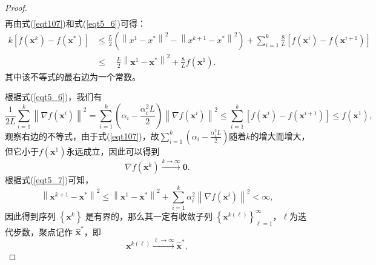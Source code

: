 \begin{proof}
\begin{equation}
\begin{split}
        \nonumber
        \end{split}
    \end{equation}
    再由式(\ref{eqt107})和式(\ref{eqt5_6})可得：
    \begin{equation}
        \begin{split}
        k\left[f\left(\bm{x}^{k}\right)-f\left(\bm{x}^{*}\right)\right]  &\leq \frac{L}{2}\left(\left\|x^{1}-x^{*}\right\|^{2}-\left\|x^{k+1}-x^{*}\right\|^{2}\right)+\sum_{i=1}^{k} \frac{8}{L}\left[f\left(\bm{x}^{i}\right)-f\left(\bm{x}^{i+1}\right)\right]\\
        & \leq \quad \frac{L}{2}\left\|\bm{x}^{1}-\bm{x}^{*}\right\|^{2}+\frac{8}{L} f\left(\bm{x}^{1}\right) .
        \label{eqt5_8}
        \end{split}
    \end{equation}
    其中该不等式的最右边为一个常数。
\par 根据式(\ref{eqt5_6})，我们有
    \begin{equation}
        \frac{1}{2 L} \sum_{i=1}^{k}\left\|\nabla f\left(\bm{x}^{i}\right)\right\|^{2}=\sum_{i=1}^{k}\left(\alpha_{i}-\frac{\alpha_{i}^{2} L}{2}\right)\left\|\nabla f\left(\bm{x}^{i}\right)\right\|^{2} \leq \sum_{i=1}^{k}\left[f\left(\bm{x}^{i}\right)-f\left(\bm{x}^{i+1}\right)\right] \leq f\left(\bm{x}^{1}\right) ,
        \nonumber
    \end{equation}
    观察右边的不等式，由于式(\ref{eqt107})，故$\sum_{i=1}^{k}\left(\alpha_{i}-\frac{\alpha_{i}^{2} L}{2}\right)$随着$k$的增大而增大，但它小于$f\left(\bm{x}^{1}\right)$永远成立，因此可以得到
    \begin{equation}
        \nabla f\left(\bm{x}^{k}\right) \stackrel{k \rightarrow \infty}{\longrightarrow} \mathbf{0} .
        \nonumber
    \end{equation}
    根据式(\ref{eqt5_7})可知，
    \begin{equation}
        \left\|\bm{x}^{k+1}-\bm{x}^{*}\right\|^{2} \leq\left\|\bm{x}^{1}-\bm{x}^{*}\right\|^{2}+\sum_{i=1}^{k} \alpha_{i}^{2}\left\|\nabla f\left(\bm{x}^{i}\right)\right\|^{2}<\infty ,
        \nonumber
    \end{equation}
    因此得到序列 $\left\{\bm{x}^{k}\right\}$ 是有界的，那么其一定有收敛子列 $\left\{\bm{x}^{k(\ell)}\right\}_{\ell=1}^{\infty}$，$\ell$为迭代步数，聚点记作 $\hat{\bm{x}}^{*}$，即
    \begin{equation}
        \bm{x}^{k(\ell)} \stackrel{\ell \rightarrow \infty}{\longrightarrow} \hat{\bm{x}}^{*} ,
        \nonumber
    \end{equation}

\end{proof}
